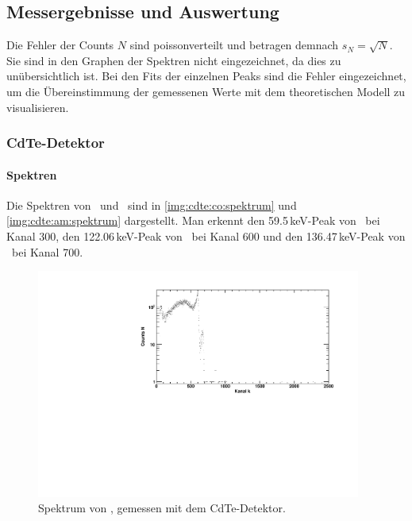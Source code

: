 \subsection{Messergebnisse und Auswertung}
Die Fehler der Counts $N$ sind poissonverteilt und betragen demnach $s_N = \sqrt{N}$. Sie sind in den Graphen der Spektren nicht eingezeichnet, 
da dies zu unübersichtlich ist. Bei den Fits der einzelnen Peaks sind die Fehler eingezeichnet, um die Übereinstimmung der gemessenen Werte 
mit dem theoretischen Modell zu visualisieren.
\subsubsection{CdTe-Detektor}
\paragraph{Spektren}
Die Spektren von \co\ und \am\ sind in \autoref{img:cdte:co:spektrum} und \autoref{img:cdte:am:spektrum} dargestellt. Man erkennt den 59.5\,keV-Peak 
von \am\, bei Kanal 300, den 122.06\,keV-Peak von \co\, bei Kanal 600 und den 136.47\,keV-Peak von \co\, bei Kanal 700.
\begin{figure}[H]
\begin{center}
  \includegraphics[width=0.95\textwidth]{../img/part3/Co-CdTe_spectrum.pdf}
  \caption{Spektrum von \co, gemessen mit dem CdTe-Detektor.}
  \label{img:cdte:co:spektrum}
\end{center}
\end{figure}

